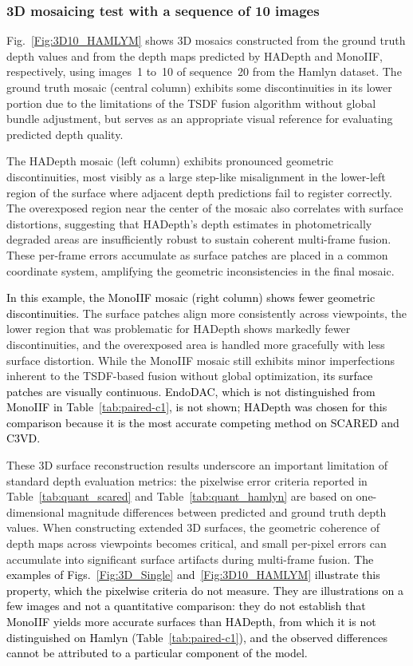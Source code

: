\documentclass[a4paper,fleqn]{cas-dc}
\begin{document}
\subsubsection*{3D mosaicing test with a sequence of 
10 images}
Fig.~\ref{Fig:3D10_HAMLYM} shows 3D mosaics constructed from the ground truth depth values and from the depth maps predicted by HADepth and MonoIIF, respectively, using images~1 to~10 of sequence~20 from the Hamlyn dataset. The ground truth mosaic (central column) exhibits some discontinuities in its lower portion due to the limitations of the TSDF fusion algorithm without global bundle adjustment, but serves as an appropriate visual reference for evaluating predicted depth quality.

The HADepth mosaic (left column) exhibits pronounced geometric discontinuities, most visibly as a large step-like misalignment in the lower-left region of the surface where adjacent depth predictions fail to register correctly. The overexposed region near the center of the mosaic also correlates with surface distortions, suggesting that HADepth's depth estimates in photometrically degraded areas are insufficiently robust to sustain coherent multi-frame fusion. These per-frame errors accumulate as surface patches are placed in a common coordinate system, amplifying the geometric inconsistencies in the final mosaic.

\textcolor{black}{In this example, the MonoIIF mosaic (right column) shows fewer geometric discontinuities.} The surface patches align more consistently across viewpoints, the lower region that was problematic for HADepth shows markedly fewer discontinuities, and the overexposed area is handled more gracefully with less surface distortion. While the MonoIIF mosaic 
still exhibits minor imperfections inherent to the TSDF-based fusion without global optimization, \textcolor{black}{its surface patches are visually continuous. EndoDAC, which is not distinguished from MonoIIF in Table~\ref{tab:paired-c1}, is not shown; HADepth was chosen for this comparison because it is the most accurate competing method on SCARED and C3VD.}

These 3D surface reconstruction results underscore an important limitation of standard depth evaluation metrics: the pixelwise error criteria reported in Table~\ref{tab:quant_scared} and Table~\ref{tab:quant_hamlyn} are based on one-dimensional magnitude differences between predicted and ground truth depth values. 
When constructing extended 3D surfaces, the geometric coherence of depth maps across viewpoints becomes critical, and small per-pixel errors can accumulate into significant surface artifacts during multi-frame fusion. \textcolor{black}{The examples of Figs.~\ref{Fig:3D_Single} and~\ref{Fig:3D10_HAMLYM} illustrate this property, which the pixelwise criteria do not measure. They are illustrations on a few images and not a quantitative comparison: they do not establish that MonoIIF yields more accurate surfaces than HADepth, from which it is not distinguished on Hamlyn (Table~\ref{tab:paired-c1}), and the observed differences cannot be attributed to a particular component of the model.}
%
\end{document}
